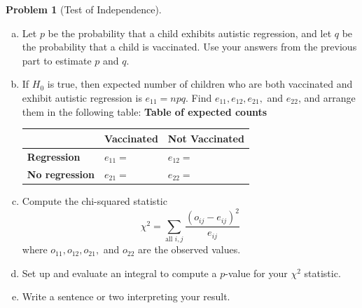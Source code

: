 \documentclass[10pt]{amsart}
\theoremstyle{definition}
\newtheorem{problem}[theorem]{Problem}
\newcommand{\vt}{\vskip 5mm} %
\newcommand{\Fl}{\vt\noindent\textbf} %
\newcommand{\1}[1]{\textbf{1}_{\left[#1\right]}} %
\begin{document}
\begin{problem}[Test of Independence]
\begin{enumerate}[(a)]
\begin{itemize}
      \item the total number of unvaccinated children
      \vspace{.75cm}
      \item the total number of children
      \vspace{.75cm}
    \end{itemize}
    \item Let $p$ be the probability that a child exhibits autistic
    regression, and let $q$ be the probability that a child is vaccinated. Use
    your answers from the previous part to estimate $p$ and $q$.
    \vspace{2cm}
    \item If $H_{0}$ is true, then expected number of children who are both
    vaccinated and exhibit autistic regression is $e_{11} = npq.$ Find
    $e_{11},e_{12},e_{21},$ and $e_{22}$, and arrange them in the following
    table:
    \Fl{Table of expected counts}
    \begin{center}
      \begin{tabular}{l|l|l|}
        & \textbf{Vaccinated} & \textbf{Not Vaccinated} \\ \hline
        \textbf{Regression}    & $e_{11}=\phantom{\displaystyle\int} $ & $e_{12}=$ \\ \hline
        \textbf{No regression} & $e_{21}=\phantom{\displaystyle\int}$ & $e_{22}=$ \\ \hline
      \end{tabular}
      \vspace{1em}
    \end{center}
    \item Compute the chi-squared statistic
    \begin{equation*}
      \chi^{2} = \sum_{\text{all }i,j} \frac{\left( o_{ij}-e_{ij} \right)^{2} }{e_{ij}} 
    \end{equation*}
    where $o_{11},o_{12},o_{21},$ and $o_{22}$ are the observed values.
    \vspace{8cm}
    \item Set up and evaluate an integral to compute a $p$-value for your
    $\chi^{2}$ statistic.
    \vspace{8cm}
    \item Write a sentence or two interpreting your result.
  \end{enumerate}
\end{problem}
\end{document}
